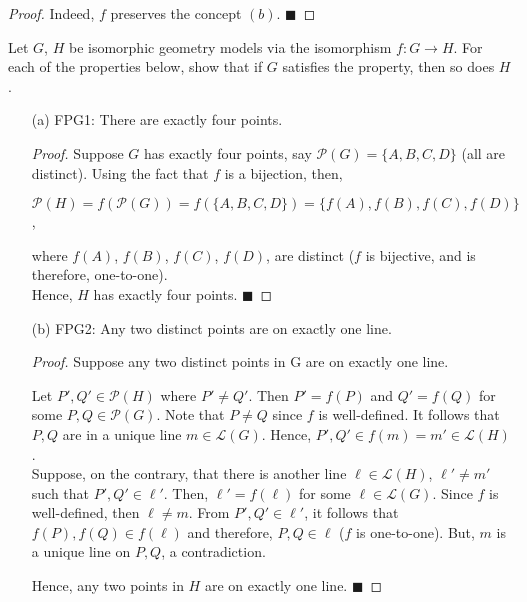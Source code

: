 \documentclass[a4paper, 10pt]{exam}
\begin{document}
\begin{questions}
\begin{enumerate}
\begin{proof}
           Indeed, $f$ preserves the concept $(b)$. $\blacksquare$
        \end{proof}
    \end{enumerate}

    \question Let $G$, $H$ be isomorphic geometry models via the isomorphism $f: G \to H$. For each of the properties below, show that if $G$ satisfies the property, then so does $H$.
    \begin{enumerate}
        \item[(a)] FPG1: There are exactly four points.
        \begin{proof}
            Suppose $G$ has exactly four points, say $\mathscr{P}(G) = \{A, B, C, D\}$ (all are distinct). Using the fact that $f$ is a bijection, then, 
            \begin{center}
                $\mathscr{P}(H) = f(\mathscr{P}(G)) = f(\{A, B, C, D\}) = \{f(A), f(B), f(C), f(D)\} $, 
            \end{center}
            where $f(A)$, $f(B)$, $f(C)$, $f(D)$, are distinct ($f$ is bijective, and is therefore, one-to-one).\\
    
            Hence, $H$ has exactly four points. $\blacksquare$
        \end{proof}
        
        \item[(b)] FPG2: Any two distinct points are on exactly one line.
        \begin{proof}
            Suppose any two distinct points in G are on exactly one line. 

            Let  $P', Q' \in \mathscr{P}(H)$ where $P' \neq Q'$. Then $P' = f(P)$ and $Q' = f(Q)$ for some $P, Q \in \mathscr{P}(G)$. Note that $P \neq Q$ since $f$ is well-defined. It follows that $P, Q$ are in a unique line $m \in \mathscr{L}(G)$. Hence,  $P', Q' \in f(m) = m' \in \mathscr{L}(H)$. \\

            Suppose, on the contrary, that there is another line $\ell \in \mathscr{L}(H)$, $\ell' \neq m'$ such that $P', Q' \in \ell'$. Then, $\ell' =f(\ell)$ for some $\ell \in \mathscr{L}(G)$. Since $f$ is well-defined, then $\ell \neq m$. From $P', Q' \in \ell'$, it follows that $f(P), f(Q) \in f(\ell)$ and therefore, $P, Q \in \ell$ ($f$ is one-to-one). But, $m$ is a unique line on $P, Q$, a contradiction.
    
            Hence, any two points in $H$ are on exactly one line. $\blacksquare$
        \end{proof}
        

\end{enumerate}
\end{questions}
\end{document}
